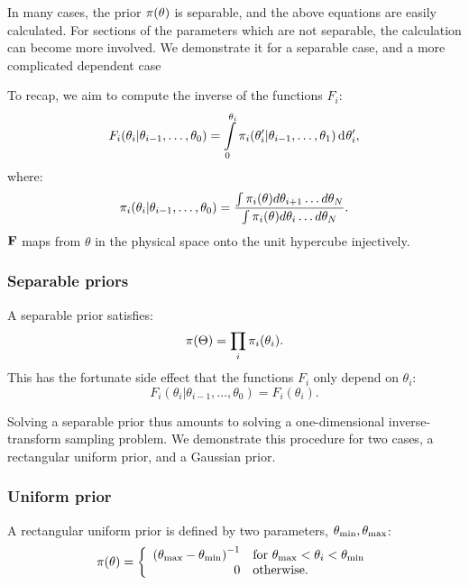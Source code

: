 In many cases, the prior \(\pi(\theta)\) is separable, and the above equations are easily calculated. For sections of the parameters which are not separable, the calculation can become more involved.  We demonstrate it for a separable case, and a more complicated dependent case

To recap, we aim to compute the inverse of the functions \(F_i\): 
\begin{equation}
  F_i(\theta_i|\theta_{i-1},\ldots,\theta_0) = \int\limits_0^{\theta_i} \pi_i(\theta_i^\prime|\theta_{i-1},\ldots,\theta_1) \operatorname{d}^{}\!{\theta_i^\prime},
  \label{eqn:pc:appFi}
\end{equation}
%
where:
%
\begin{equation}
  \pi_i(\theta_i|\theta_{i-1},\ldots,\theta_0) 
  =
  \frac{%
    \int \pi_i(\theta) d\theta_{i+1}\ldots d\theta_{N}
  }{%
    \int \pi_i(\theta) d\theta_{i}\ldots d\theta_{N}
  }.
  \label{eqn:pc:apppii}
\end{equation}
\(\mathbf{F}\) maps from \(\theta\) in the physical space onto the unit hypercube injectively. 



\subsubsection{Separable priors}
\label{sec:pc:separable_priors}
A separable prior satisfies:
\begin{equation}
  \pi(\Theta) = \prod_i\pi_i(\theta_i).
  \label{eqn:pc:separability}
\end{equation}
This has the fortunate side effect that the functions \(F_i\) only depend on \(\theta_i\):
\begin{equation}
  F_i(\theta_i|\theta_{i-1},\ldots,\theta_0) = F_i(\theta_i).
\end{equation}

Solving a separable prior thus amounts to solving a one-dimensional inverse-transform sampling problem. We demonstrate this procedure for two cases, a rectangular uniform prior, and a Gaussian prior.

\subsubsection{Uniform prior}
\label{sec:pc:uniform_prior}
\newcommand{\thetamin}{\theta_\smin} %
\newcommand{\thetamax}{\theta_\smax} %
A rectangular uniform prior is defined by two parameters, \({\thetamin,\thetamax}\):
\begin{equation}
  \pi(\theta) = 
  \left\{
    \begin{array}{rl}
      {(\thetamax - \thetamin)}^{-1} 
      &
      \text{for }\thetamax<\theta_i<\thetamin \\
      0 & \text{otherwise.}
    \end{array}
  \right.
\label{eqn:pc:uniform_prior}
\end{equation}

